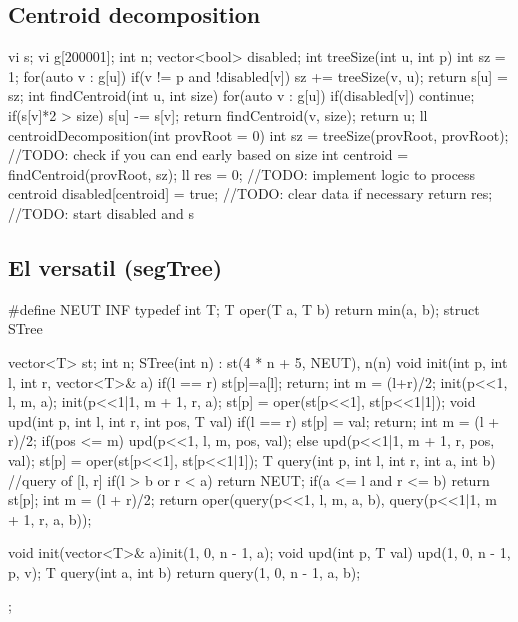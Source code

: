 \documentclass[10pt, landscape, twocolumn, a4paper, notitlepage]{article}
\begin{document}
\subsection{Centroid decomposition}
\begin{code}
vi s;
vi g[200001];
int n;
vector<bool> disabled;
int treeSize(int u, int p) {
    int sz = 1;
    for(auto v : g[u]) {
        if(v != p and !disabled[v]) {
            sz += treeSize(v, u);
        }
    }
    return s[u] = sz;
} 
int findCentroid(int u, int size) {
    for(auto v : g[u]) {
        if(disabled[v]) continue;
        if(s[v]*2 > size) {
            s[u] -= s[v];  
            return findCentroid(v, size);
        }
    }
    return u;
}
ll centroidDecomposition(int provRoot = 0) {
    int sz = treeSize(provRoot, provRoot);
    //TODO: check if you can end early based on size
    int centroid = findCentroid(provRoot, sz);
    ll res = 0;
    //TODO: implement logic to process centroid
    disabled[centroid] = true;
    //TODO: clear data if necessary
    return res;
}
//TODO: start disabled and s
\end{code}

\subsection{El versatil (segTree)}
\begin{code}
#define NEUT INF
typedef int T;
T oper(T a, T b) {return min(a, b);}
struct STree {
    vector<T> st; int n;
    STree(int n) : st(4 * n + 5, NEUT), n(n) {}
    void init(int p, int l, int r, vector<T>& a) {
        if(l == r) {st[p]=a[l]; return;}
        int m = (l+r)/2;
        init(p<<1, l, m, a); init(p<<1|1, m + 1, r, a);
        st[p] = oper(st[p<<1], st[p<<1|1]);
    }
    void upd(int p, int l, int r, int pos, T val) {
        if(l == r) {st[p] = val; return;}
        int m = (l + r)/2;
        if(pos <= m) upd(p<<1, l, m, pos, val);
        else upd(p<<1|1, m + 1, r, pos, val);
        st[p] = oper(st[p<<1], st[p<<1|1]);
    }
    T query(int p, int l, int r, int a, int b) { //query of [l, r]
        if(l > b or r < a) return NEUT;
        if(a <= l and r <= b) return st[p];
        int m = (l + r)/2;
        return oper(query(p<<1, l, m, a, b), query(p<<1|1, m + 1, r, a, b));
    }

    void init(vector<T>& a){init(1, 0, n - 1, a);}
    void upd(int p, T val) {upd(1, 0, n - 1, p, v);}
    T query(int a, int b) {return query(1, 0, n - 1, a, b);}
};
\end{code}
\end{document}
